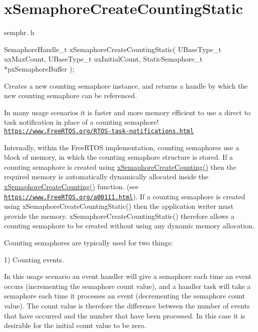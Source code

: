 \hypertarget{group__x_semaphore_create_counting_static}{}\section{x\+Semaphore\+Create\+Counting\+Static}
\label{group__x_semaphore_create_counting_static}
semphr. h 
\begin{DoxyPre}
SemaphoreHandle\_t xSemaphoreCreateCountingStatic( UBaseType\_t uxMaxCount, UBaseType\_t uxInitialCount, StaticSemaphore\_t *pxSemaphoreBuffer );
\end{DoxyPre}


Creates a new counting semaphore instance, and returns a handle by which the new counting semaphore can be referenced.

In many usage scenarios it is faster and more memory efficient to use a direct to task notification in place of a counting semaphore! \href{https://www.FreeRTOS.org/RTOS-task-notifications.html}{\tt https\+://www.\+Free\+R\+T\+O\+S.\+org/\+R\+T\+O\+S-\/task-\/notifications.\+html}

Internally, within the Free\+R\+T\+OS implementation, counting semaphores use a block of memory, in which the counting semaphore structure is stored. If a counting semaphore is created using \hyperlink{vendor_2ceedling_2plugins_2freertos_2src_2freertos_2include_2semphr_8h_a7764616a918a46115403569a88148ad4}{x\+Semaphore\+Create\+Counting()} then the required memory is automatically dynamically allocated inside the \hyperlink{vendor_2ceedling_2plugins_2freertos_2src_2freertos_2include_2semphr_8h_a7764616a918a46115403569a88148ad4}{x\+Semaphore\+Create\+Counting()} function. (see \href{https://www.FreeRTOS.org/a00111.html}{\tt https\+://www.\+Free\+R\+T\+O\+S.\+org/a00111.\+html}). If a counting semaphore is created using x\+Semaphore\+Create\+Counting\+Static() then the application writer must provide the memory. x\+Semaphore\+Create\+Counting\+Static() therefore allows a counting semaphore to be created without using any dynamic memory allocation.

Counting semaphores are typically used for two things\+:

1) Counting events.

In this usage scenario an event handler will \textquotesingle{}give\textquotesingle{} a semaphore each time an event occurs (incrementing the semaphore count value), and a handler task will \textquotesingle{}take\textquotesingle{} a semaphore each time it processes an event (decrementing the semaphore count value). The count value is therefore the difference between the number of events that have occurred and the number that have been processed. In this case it is desirable for the initial count value to be zero.

